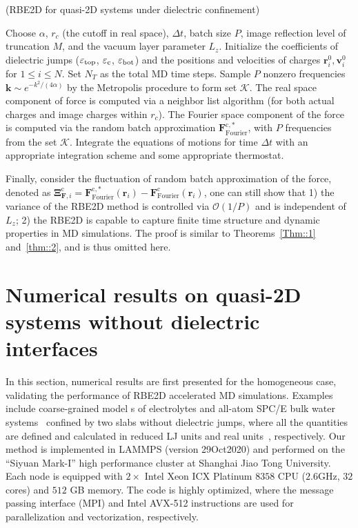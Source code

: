 \begin{algorithm}[H]
 \caption{(RBE2D for quasi-2D systems under dielectric confinement)}\label{alg::RBEalg}
 \begin{algorithmic}[1]
  \State Choose $\alpha$, $r_c$ (the cutoff in real space), $\Delta t$, batch size $P$, image reflection level of truncation $M$, and the vacuum layer parameter $L_z$. Initialize the coefficients of dielectric jumps ($\varepsilon_{\rm{top}}$, $\varepsilon_{\rm{c}}$, $\varepsilon_{\rm{bot}}$) and the positions and velocities of charges $\bm{r}^0_i, \bm{v}^0_i$ for $1\le i\le N$. Set $N_T$ as the total MD time steps.
  \State Sample $P$ nonzero frequencies $\bm{k}\sim e^{-k^2/(4\alpha)}$ by the Metropolis procedure to form set $\mathcal{K}$.
  \State The real space component of force is computed via a neighbor list algorithm (for both actual charges and image charges within $r_c$).
  \State The Fourier space component of  {the} force is computed via the random batch approximation $\bm{F}_{\text{Fourier}}^{\text{c},*}$, with $P$ frequencies from the set $\mathcal{K}$.
  \State Integrate the equations of motions for time $\Delta t$ with  {an} appropriate integration scheme and some appropriate thermostat. 
  \EndFor
 \end{algorithmic}
\end{algorithm}

Finally, consider the fluctuation of random batch approximation of the force, denoted as $\bm{\Xi}_{\bm{F},i}^{\text{c}}=\bm{F}_{\text{Fourier}}^{\text{c},*}(\bm{r}_i)-\bm{F}_{\text{Fourier}}^{\text{c}}(\bm{r}_i)$, one can still show that 1) the variance of the RBE2D method is controlled via $\mathcal{O}(1/P)$ and is independent of $L_z$; 2) the RBE2D is capable to capture finite time structure and dynamic properties in MD simulations. 
The proof is similar to Theorems~\ref{Thm::1} and~\ref{thm::2}, and is thus omitted here.

\section{Numerical results on quasi-2D systems without dielectric interfaces}\label{sec::numerical}

In this section, numerical results are first presented for the homogeneous case, validating the performance of RBE2D accelerated MD simulations. 
Examples include coarse-grained model {s} of electrolytes and all-atom SPC/E bulk water systems~\cite{berendsen1987missing} confined by two slabs without dielectric jumps,  {where all the quantities are defined and calculated in reduced LJ units and real units~\cite{frenkel2023understanding}, respectively.}
Our method is implemented in LAMMPS (version 29Oct2020) \cite{thompson2021lammps} and performed on the ``Siyuan Mark-I'' high performance cluster at Shanghai Jiao Tong University. 
Each node is equipped with $2\times$ Intel Xeon ICX Platinum $8358$ CPU ($2.6$GHz, $32$ cores) and $512$ GB memory.
The code is highly optimized, where  {the} message passing interface (MPI) and Intel AVX-512 instructions are used for parallelization and vectorization, respectively.

